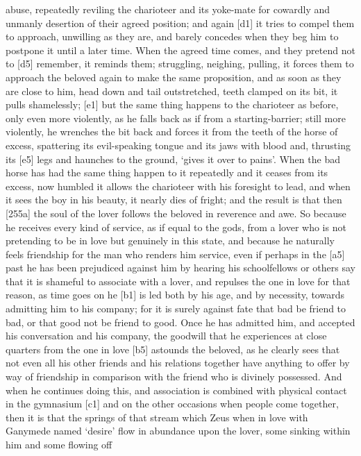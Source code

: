 abuse, repeatedly reviling the charioteer and its yoke-mate for cowardly
and unmanly desertion of their agreed position; and again {[}d1{]} it
tries to compel them to approach, unwilling as they are, and barely
concedes when they beg him to postpone it until a later time. When the
agreed time comes, and they pretend not to {[}d5{]} remember, it reminds
them; struggling, neighing, pulling, it forces them to approach the
beloved again to make the same proposition, and as soon as they are
close to him, head down and tail outstretched, teeth clamped on its bit,
it pulls shamelessly; {[}e1{]} but the same thing happens to the
charioteer as before, only even more violently, as he falls back as if
from a starting-barrier;
 still more violently,
he wrenches the bit back and forces it from the teeth of the horse of
excess, spattering its evil-speaking tongue and its jaws with blood and,
thrusting its {[}e5{]} legs and haunches to the ground, ‘gives it over
to pains'. When the bad
horse has had the same thing happen to it repeatedly and it ceases from
its excess, now humbled it allows the charioteer with his foresight to
lead, and when it sees the boy in his beauty, it nearly dies of fright;
and the result is that then {[}255a{]} the soul of the lover follows the
beloved in reverence and awe. So because he receives every kind of
service, as if equal to the gods, from a lover who is not pretending to
be in love but genuinely in this state, and because he naturally feels
friendship for the man who renders him service, even if perhaps in the
{[}a5{]} past he has been prejudiced against him by hearing his
schoolfellows or others say that it is shameful to associate with a
lover, and repulses the one in love for that reason, as time goes on he
{[}b1{]} is led both by his age, and by necessity, towards admitting him
to his company; for it is surely against fate that bad be friend to bad,
or that good not be friend to good. Once he has admitted him, and
accepted his conversation and his company, the goodwill that he
experiences at close quarters from the one in love {[}b5{]} astounds the
beloved, as he clearly sees that not even all his other friends and his
relations together have anything to offer by way of friendship in
comparison with the friend who is divinely possessed. And when he
continues doing this, and association is combined with physical contact
in the gymnasium {[}c1{]} and on the other occasions when people come
together, then it is that the springs of that stream which Zeus when in
love with Ganymede named
‘desire' flow in
abundance upon the lover, some sinking within him and some flowing off
